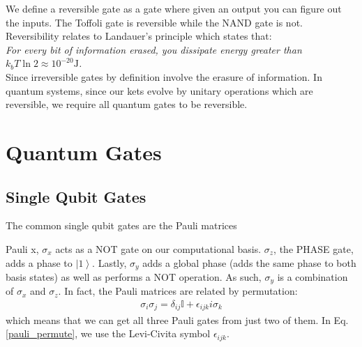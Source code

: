 \documentclass[11pt]{article} %
\newcommand{\ket}[1]{\left|#1\right\rangle}
\begin{document}
We define a reversible gate as a gate where given an output you can figure out the inputs. The Toffoli gate is reversible while the NAND gate is not. Reversibility relates to Landauer's principle which states that:\\

\noindent\textit{For every bit of information erased, you dissipate energy greater than $k_bT\ln2 \approx 10^{-20} \textrm{J}$.}\\

\noindent Since irreversible gates by definition involve the erasure of information. In quantum systems, since our kets evolve by unitary operations which are reversible, we require all quantum gates to be reversible.

\section{Quantum Gates}
\subsection{Single Qubit Gates}
The common single qubit gates are the Pauli matrices

Pauli x, $\sigma_x$ acts as a NOT gate on our computational basis. $\sigma_z$, the PHASE gate, adds a phase to $\ket{1}$. Lastly, $\sigma_y$ adds a global phase (adds the same phase to both basis states) as well as performs a NOT operation. As such, $\sigma_y$ is a combination of $\sigma_x$ and $\sigma_z$. In fact, the Pauli matrices are related by permutation:
\begin{align}
    \sigma_i\sigma_j = \delta_{ij}\mathbb{I} + \epsilon_{ijk}i\sigma_k
    \label{pauli_permute}
\end{align}
which means that we can get all three Pauli gates from just two of them. In Eq. \ref{pauli_permute}, we use the Levi-Civita symbol $\epsilon_{ijk}$.
\end{document}
